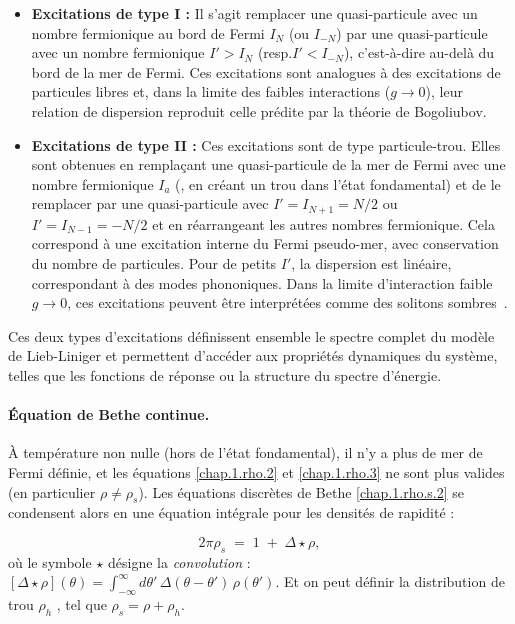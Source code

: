 \begin{itemize}
    \item \textbf{Excitations de type I :} Il s’agit remplacer une quasi-particule avec un nombre fermionique au bord de Fermi $I_{N}$ (ou $I_{-N}$) par une quasi-particule avec un nombre fermionique $I'> I_N$ (resp.$I' <I_{-N}$), c’est-à-dire au-delà du bord de la mer de Fermi. Ces excitations sont analogues à des excitations de particules libres et, dans la limite des faibles interactions ($g \to 0$), leur relation de dispersion reproduit celle prédite par la théorie de Bogoliubov.

    \item \textbf{Excitations de type II :} Ces excitations sont de type particule-trou. Elles sont obtenues en remplaçant une quasi-particule de la mer de Fermi avec une nombre fermionique $I_a$ (\ie, en créant un trou dans l’état fondamental) et de le remplacer par une quasi-particule avec $I' = I_{N+1} = N/2$ ou $I' = I_{N-1} = -N/2$ et en réarrangeant les autres nombres fermionique. Cela correspond à une excitation interne du Fermi pseudo-mer, avec conservation du nombre de particules. Pour de petits $I'$, la dispersion est linéaire, correspondant à des modes phononiques. Dans la limite d’interaction faible \( g \to 0 \), ces excitations peuvent être interprétées comme des solitons sombres~\cite{Kulish1976}.
\end{itemize}

Ces deux types d’excitations définissent ensemble le spectre complet du modèle de Lieb-Liniger et permettent d’accéder aux propriétés dynamiques du système, telles que les fonctions de réponse ou la structure du spectre d’énergie.

\paragraph{Équation de Bethe continue.}

À température non nulle (hors de l’état fondamental), il n’y a plus de mer de Fermi définie, et les équations \eqref{chap.1.rho.2} et \eqref{chap.1.rho.3} ne sont plus valides (en particulier $\rho \neq \rho_s$). Les équations discrètes de Bethe \eqref{chap.1.rho.s.2} se condensent alors en une équation intégrale pour les densités de rapidité :

\begin{equation}
	2\pi \rho_s \;=\; 1 \;+\;\Delta \star \rho,
\label{eq:TBA-rhos}
\end{equation}
où le symbole $\star$ désigne la \emph{convolution} :
\(
	[\Delta \star \rho](\theta) = \int_{-\infty}^{\infty} d\theta' \, \Delta(\theta - \theta') \, \rho(\theta').
\)
Et on peut définir la distribution de trou $\rho_h$ , tel que $\rho_s = \rho + \rho_h$. \\

